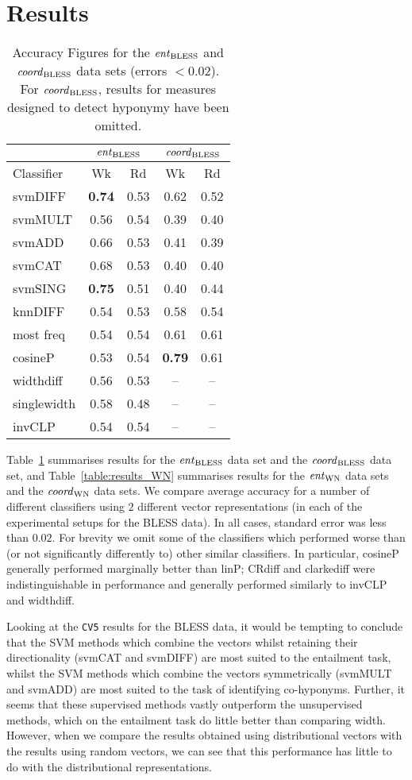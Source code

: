 \documentclass[11pt]{article}
\newcommand\entBLESS{\mbox{\em ent\/}_{\mbox{\scriptsize BLESS}}}
\newcommand\coordBLESS{\mbox{\em coord\/}_{\mbox{\scriptsize BLESS}}}
\newcommand\entWN{\mbox{\em ent\/}_{\mbox{\scriptsize WN}}}
\newcommand\coordWN{\mbox{\em coord\/}_{\mbox{\scriptsize WN}}}
\begin{document}
\section{Results}
\label{sect:results}

\begin{table}[ht]
\centering
\begin{tabular}{|l|c|c||c|c|}
\hline
&\multicolumn{2}{|c||}{$\entBLESS$}&\multicolumn{2}{|c|}{$\coordBLESS$}\\
\hline
Classifier&Wk&Rd&Wk&Rd\\
\hline
svmDIFF&\textbf{0.74}&0.53&0.62&0.52\\
svmMULT&0.56&0.54&0.39&0.40\\
svmADD&0.66&0.53&0.41&0.39\\
svmCAT&0.68&0.53&0.40&0.40\\
svmSING&\textbf{0.75}&0.51&0.40&0.44\\
knnDIFF&0.54&0.53&0.58&0.54\\
\hline
most freq&0.54&0.54&0.61&0.61\\
cosineP&0.53&0.54&\textbf{0.79}&0.61\\
widthdiff&0.56&0.53&--&--\\
singlewidth&0.58&0.48&--&--\\
invCLP&0.54&0.54&--&--\\
\hline
\end{tabular}
\caption{Accuracy Figures for the $\entBLESS$ and
  $\coordBLESS$ data sets (errors $< $0.02). For
  $\coordBLESS$, results for measures designed to detect hyponymy
  have been omitted.}
\label{table:results_ent}
\end{table}


Table~\ref{table:results_ent} summarises results for the $\entBLESS$ data set and the $\coordBLESS$ data set, and Table~\ref{table:results_WN} summarises results for the $\entWN$ data sets and the $\coordWN$ data sets.  We compare average accuracy for a number of different classifiers using $2$ different vector representations (in each of the experimental setups for the BLESS data).  In all cases, standard error was less than $0.02$.  For brevity we omit some of the classifiers which performed worse than (or not significantly differently to) other similar classifiers.  In particular, cosineP generally performed marginally better than linP; CRdiff and clarkediff were indistinguishable in performance and generally performed similarly to invCLP and widthdiff.

Looking at the \texttt{CV5} results for the BLESS data, it would be tempting to conclude that the SVM methods which combine the vectors whilst retaining their directionality (svmCAT and svmDIFF) are most suited to the entailment task, whilst the SVM methods which combine the vectors symmetrically (svmMULT and svmADD) are most suited to the task of identifying co-hyponyms.  Further, it  seems that these supervised methods vastly outperform the unsupervised methods, which on the entailment task do little better than comparing width.  However, when we compare the results obtained using distributional vectors with the results using random vectors, we can see that this performance has little to do with the distributional representations.  
\end{document}
